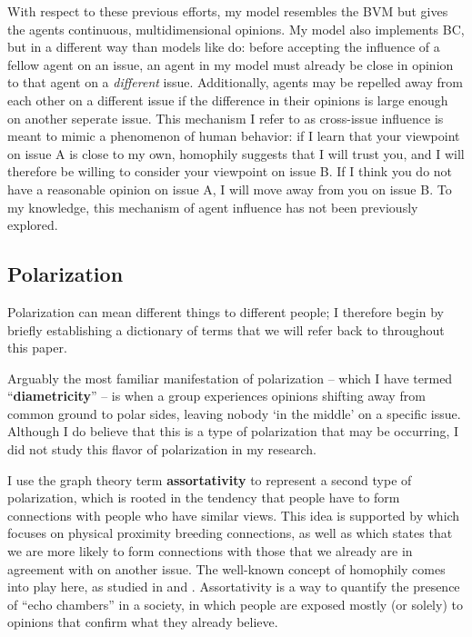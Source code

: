 With respect to these previous efforts, my model resembles the BVM but gives
the agents continuous, multidimensional opinions. My model also implements BC, but in
a different way than models like \cite{tsang_opinion_2014} do: before accepting
the influence of a fellow agent on an issue, an agent in my model must already
be close in opinion to that agent on a \textit{different} issue. Additionally, agents may be repelled away from each other on a different issue if the difference in their opinions is large enough on another seperate issue. This mechanism I refer to as  
cross-issue influence is meant to mimic a phenomenon of human behavior: if I learn that your viewpoint on
issue A is close to my own, homophily suggests that I will trust you, and I
will therefore be willing to consider your viewpoint on issue B. If I think you do not have a reasonable opinion on issue A, I will move away from you on issue B. To my
knowledge, this mechanism of agent influence has not been previously explored.

\subsection{Polarization}

Polarization can mean different things to different people; I therefore begin
by briefly establishing a dictionary of terms that we will refer back to
throughout this paper.

Arguably the most familiar manifestation of polarization -- which I have termed
``\textbf{diametricity}'' -- is when a group experiences opinions shifting away
from common ground to polar sides, leaving nobody `in the middle' on a specific
issue. Although I do believe that this is a type of polarization that may be occurring, I did not study this flavor of polarization in my research.

I use the graph theory term \textbf{assortativity} to represent a second type
of polarization, which is rooted in the tendency that people have to form
connections with people who have similar views. This idea is supported by
\cite{klinkner_red_2005} which focuses on physical proximity breeding
connections, as well as \cite{cholvy_diffusion_2016} which states that we are
more likely to form connections with those that we already are in agreement
with on another issue. The well-known concept of homophily comes into play
here, as studied in \cite{davies_twin_2017} and \cite{taylor_exploring_2018}.
Assortativity is a way to quantify the presence of ``echo chambers'' in a
society, in which people are exposed mostly (or solely) to opinions that
confirm what they already
believe.\cite{dandekar_biased_2013,flaxman_filter_2016}

